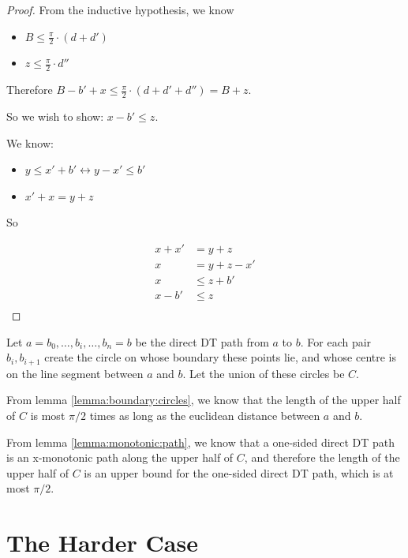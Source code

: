 \documentclass{tufte-handout}
\begin{document}
\begin{proof}
From the inductive hypothesis, we know

\begin{itemize}

\item $B \le \frac{\pi}{2} \cdot (d + d')$

\item $z \le \frac{\pi}{2} \cdot d''$

\end{itemize}

Therefore $B - b' + x \le \frac{\pi}{2} \cdot (d + d' + d'') = B
+ z$.

So we wish to show: $x - b' \le z$.

We know:

\begin{itemize}

\item $y \le x' + b' \leftrightarrow y - x' \le b'$

\item $x' + x = y + z$

\end{itemize}

So

\begin{align*}
  x + x' &= y + z \\
  x &= y + z - x' \\
  x &\le z + b' \\
  x - b' &\le z \\
\end{align*}
  
\end{proof}

Let $a = b_0, \ldots, b_i, \ldots, b_n = b$ be the direct DT path from
$a$ to $b$.  For each pair $b_i, b_{i+1}$ create the circle on whose
boundary these points lie, and whose centre is on the line segment
between $a$ and $b$.  Let the union of these circles be $C$.

From lemma \ref{lemma:boundary:circles}, we know that the length of
the upper half of $C$ is most $\pi/2$ times as long as the euclidean
distance between $a$ and $b$.

From lemma \ref{lemma:monotonic:path}, we know that a one-sided direct
DT path is an x-monotonic path along the upper half of $C$, and
therefore the length of the upper half of $C$ is an upper bound for
the one-sided direct DT path, which is at most $\pi/2$.

\section{The Harder Case}
\end{document}
